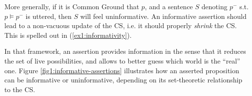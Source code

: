 More generally, if it is Common Ground that $p$, and a sentence $S$ denoting $p^-$ s.t. $p \vDash p^-$ is uttered, then $S$ will feel uninformative. An informative assertion should lead to a non-vacuous update of the CS, i.e. it should properly \textit{shrink} the CS. This is spelled out in (\ref{ex1:informativity}).

\begin{exe}
	\label{ex1:informativity}
\end{exe}


In that framework, an assertion provides information in the sense that it reduces the set of live possibilities, and allows to better guess which world is the ``real'' one. Figure \ref{fig1:informative-assertions} illustrates how an asserted proposition can be informative or uninformative, depending on its set-theoretic relationship to the CS.

